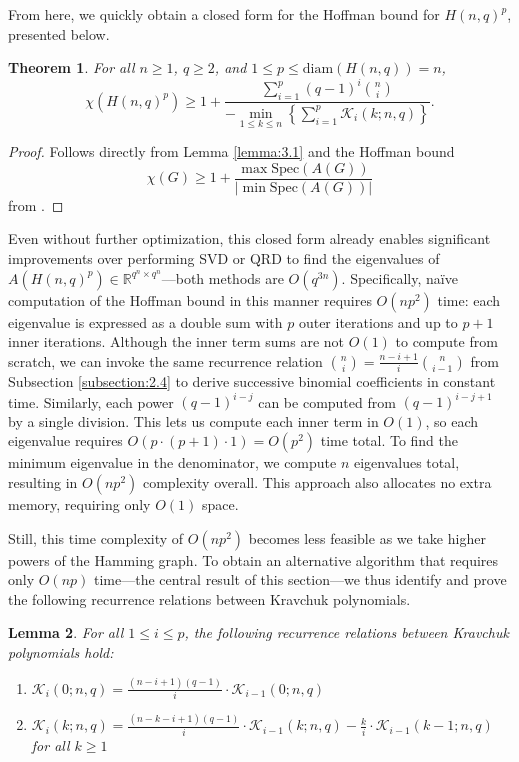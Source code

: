 \documentclass{article}
\def\R{\mathbb{R}}
\def\K{\mathcal{K}}
\numberwithin{equation}{section}
\theoremstyle{plain}
\newtheorem{theorem}{Theorem}[section]
\newtheorem{lemma}[theorem]{Lemma}
\begin{document}
From here, we quickly obtain a closed form for the Hoffman bound for $H(n, q)^p$, presented below.

\begin{theorem}\label{thm:3.3}
    For all $n \ge 1$, $q \ge 2$, and $1 \le p \le \mathrm{diam}(H(n, q)) = n$,
    \[\chi(H(n, q)^p) \geq 1 + \dfrac{\sum_{i = 1}^p (q - 1)^i \binom{n}{i}}{-\min\limits_{1 \le k \le n}\left\{\sum_{i = 1}^p \K_i(k; n, q)\right\}}.\]
\end{theorem}

\begin{proof}
    Follows directly from Lemma \ref{lemma:3.1} and the Hoffman bound
    \[\chi(G) \ge 1 + \frac{\max\mathrm{Spec}(A(G))}{\lvert \min\mathrm{Spec}(A(G)) \rvert}\]
    from \cite{Hof03}.
\end{proof}

Even without further optimization, this closed form already enables significant improvements over performing SVD or QRD to find the eigenvalues of $A(H(n, q)^p) \in \R^{q^n \times q^n}$---both methods are $O(q^{3n})$. Specifically, na\"ive computation of the Hoffman bound in this manner requires $O(np^2)$ time: each eigenvalue is expressed as a double sum with $p$ outer iterations and up to $p + 1$ inner iterations. Although the inner term sums are not $O(1)$ to compute from scratch, we can invoke the same recurrence relation $\binom{n}{i} = \frac{n - i + 1}{i}\binom{n}{i - 1}$ from Subsection \ref{subsection:2.4} to derive successive binomial coefficients in constant time. Similarly, each power $(q - 1)^{i - j}$ can be computed from $(q - 1)^{i - j + 1}$ by a single division. This lets us compute each inner term in $O(1)$, so each eigenvalue requires $O(p \cdot (p + 1) \cdot 1) = O(p^2)$ time total. To find the minimum eigenvalue in the denominator, we compute $n$ eigenvalues total, resulting in $O(np^2)$ complexity overall. This approach also allocates no extra memory, requiring only $O(1)$ space.

Still, this time complexity of $O(np^2)$ becomes less feasible as we take higher powers of the Hamming graph. To obtain an alternative algorithm that requires only $O(np)$ time---the central result of this section---we thus identify and prove the following recurrence relations between Kravchuk polynomials.

\begin{lemma}\label{lemma:3.4}
    For all $1 \le i \le p$, the following recurrence relations between Kravchuk polynomials hold:
    \begin{enumerate}[label=(\roman*)]
        \item $\displaystyle \K_i(0; n, q) = \frac{(n - i + 1)(q - 1)}{i} \cdot \K_{i - 1}(0; n, q)$
        \item $\displaystyle \K_i(k; n, q) = \frac{(n - k - i + 1)(q - 1)}{i} \cdot \K_{i - 1}(k; n, q) - \frac{k}{i} \cdot \K_{i - 1}(k - 1; n, q)$ for all $k \ge 1$
    \end{enumerate}
\end{lemma}
\end{document}
